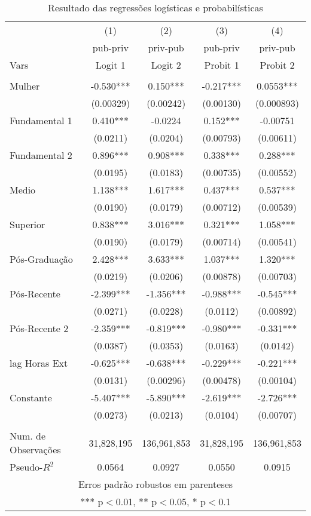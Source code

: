 \documentclass[a4paper]{article}
\begin{document}
\begin{table}[H]
\centering
\caption{Resultado das regressões logísticas e probabilísticas}
\label{tab3}
\begin{tabular}{lcccc} \hline
 & (1) & (2) & (3) & (4) \\
 & pub-priv & priv-pub & pub-priv & priv-pub\\
Vars & Logit 1 & Logit 2 & Probit 1 & Probit 2 \\ \hline
 &  &  &  &  \\
Mulher & -0.530*** & 0.150*** & -0.217*** & 0.0553*** \\
 & (0.00329) & (0.00242) & (0.00130) & (0.000893) \\
Fundamental 1 & 0.410*** & -0.0224 & 0.152*** & -0.00751 \\
 & (0.0211) & (0.0204) & (0.00793) & (0.00611) \\
Fundamental 2 & 0.896*** & 0.908*** & 0.338*** & 0.288*** \\
 & (0.0195) & (0.0183) & (0.00735) & (0.00552) \\
Medio & 1.138*** & 1.617*** & 0.437*** & 0.537*** \\
 & (0.0190) & (0.0179) & (0.00712) & (0.00539) \\
Superior & 0.838*** & 3.016*** & 0.321*** & 1.058*** \\
 & (0.0190) & (0.0179) & (0.00714) & (0.00541) \\
Pós-Graduação & 2.428*** & 3.633*** & 1.037*** & 1.320*** \\
 & (0.0219) & (0.0206) & (0.00878) & (0.00703) \\
Pós-Recente & -2.399*** & -1.356*** & -0.988*** & -0.545*** \\
 & (0.0271) & (0.0228) & (0.0112) & (0.00892) \\
Pós-Recente 2 & -2.359*** & -0.819*** & -0.980*** & -0.331*** \\
 & (0.0387) & (0.0353) & (0.0163) & (0.0142) \\
lag Horas Ext & -0.625*** & -0.638*** & -0.229*** & -0.221*** \\
 & (0.0131) & (0.00296) & (0.00478) & (0.00104) \\
Constante & -5.407*** & -5.890*** & -2.619*** & -2.726*** \\
 & (0.0273) & (0.0213) & (0.0104) & (0.00707) \\
 &  &  &  &  \\
 Num. de Observações & 31,828,195 & 136,961,853 & 31,828,195 & 136,961,853 \\ 
 Pseudo-$R^2$ & 0.0564 &  0.0927 & 0.0550 & 0.0915 \\ \hline
\multicolumn{5}{c}{ Erros padrão robustos em parenteses} \\
\multicolumn{5}{c}{ *** p$<$0.01, ** p$<$0.05, * p$<$0.1} \\
\end{tabular}

\end{table}
\end{document}
